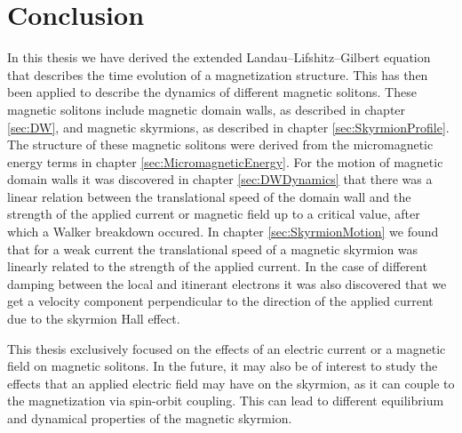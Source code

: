 \documentclass[12pt, a4paper, twoside, openright]{article}		%
\let\oldsection\section
\def\section{\cleardoublepage\oldsection}
\numberwithin{equation}{section}
\begin{document}
\section{Conclusion}
In this thesis we have derived the extended Landau--Lifshitz--Gilbert equation that describes the time evolution of a magnetization structure. This has then been applied to describe the dynamics of different magnetic solitons. These magnetic solitons include magnetic domain walls, as described in chapter \ref{sec:DW}, and magnetic skyrmions, as described in chapter \ref{sec:SkyrmionProfile}. The structure of these magnetic solitons were derived from the micromagnetic energy terms in chapter \ref{sec:MicromagneticEnergy}. For the motion of magnetic domain walls it was discovered in chapter \ref{sec:DWDynamics} that there was a linear relation between the translational speed of the domain wall and the strength of the applied current or magnetic field up to a critical value, after which a Walker breakdown occured. In chapter \ref{sec:SkyrmionMotion} we found that for a weak current the translational speed of a magnetic skyrmion was linearly related to the strength of the applied current. In the case of different damping between the local and itinerant electrons it was also discovered that we get a velocity component perpendicular to the direction of the applied current due to the skyrmion Hall effect.

This thesis exclusively focused on the effects of an electric current or a magnetic field on magnetic solitons. In the future, it may also be of interest to study the effects that an applied electric field may have on the skyrmion, as it can couple to the magnetization via spin-orbit coupling. This can lead to different equilibrium and dynamical properties of the magnetic skyrmion.



\end{document}
